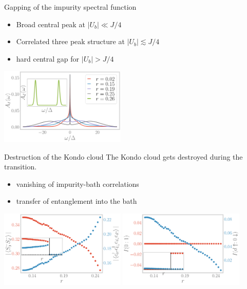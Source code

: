 \documentclass[8pt,aspectratio=169]{beamer}
\newcommand{\nitem}{\item[\ding{51}]}
\begin{document}
\begin{frame}{Gapping of the impurity spectral function}
\begin{itemize}
\nitem Broad central peak at \(|U_b| \ll J/4\)\\[10pt]
\nitem Correlated \alert{three peak} structure at \(|U_b| \lesssim J/4\)\\[10pt]
\nitem hard central \alert{gap} for  \(|U_b| > J/4\)\
\end{itemize}

\includegraphics[width=0.45\textwidth]{Add.pdf}
\end{frame}

\begin{frame}{Destruction of the Kondo cloud}
\centering
\alert{The Kondo cloud gets destroyed during the transition.}

\vspace*{\fill}

\begin{itemize}
	\nitem vanishing of impurity-bath correlations
	\nitem transfer of entanglement into the bath
\end{itemize}

\vspace*{\fill}

\includegraphics[width=0.45\textwidth]{pairing.pdf}
\hspace*{\fill}
\includegraphics[width=0.45\textwidth]{I_r.pdf}
\end{frame}
\end{document}
